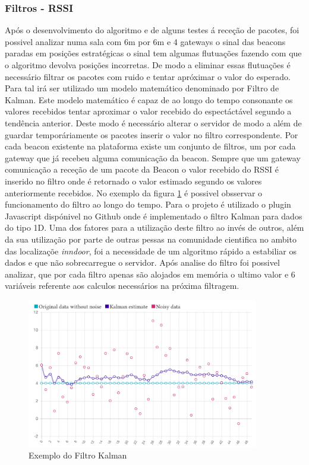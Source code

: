 \subsubsection{Filtros - RSSI}

\par  Após o desenvolvimento do algoritmo e de alguns testes á receção de pacotes, foi possivel analizar numa sala com 6m por 6m  e 4 gateways o sinal das beacons paradas em posições estratégicas   o sinal tem algumas flutuações fazendo com que o algoritmo devolva posições incorretas. De modo a eliminar essas flutuações é necessário filtrar os pacotes com ruido e tentar apróximar o valor do esperado. Para tal irá ser utilizado um modelo matemático denominado por Filtro de Kalman. Este modelo matemático é capaz de ao longo do tempo consonante os valores recebidos tentar aproximar o valor recebido do espectáctável segundo a tendência anterior. Deste modo é necessário alterar o servidor de modo a além de guardar temporáriamente os pacotes inserir o valor no filtro correspondente. Por cada beacon existente na plataforma existe um conjunto de filtros, um por cada gateway que já recebeu alguma comunicação da beacon. Sempre que um gateway comunicação a receção de um pacote da Beacon o valor recebido do RSSI é inserido no filtro onde é retornado o valor estimado segundo os valores anteriormente recebidos. No exemplo da figura \ref{kalman1} é possivel obsservar o funcionamento do filtro ao longo do tempo. Para o projeto é utilizado o plugin Javascript dispónivel no Github onde é implementado o filtro Kalman para dados do tipo 1D. Uma dos fatores para a utilização deste filtro ao invés de outros, além da sua utilização por parte de outras pessas na comunidade cientifica no ambito das localizaçõe \textit{inndoor}, foi a necessidade de um algoritmo rápido a estabiliar os dados e que não sobrecarregue o servidor. Após analise do filtro foi possivel analizar, que por cada filtro apenas são alojados em memória o ultimo valor e 6 variáveis referente aos calculos necessários na próxima filtragem. 

 \begin{figure}[ht]
\centering
\includegraphics[width=0.90\textwidth]{images/kalman-example.png}
\caption{Exemplo do Filtro Kalman \cite{kalman}}\label{kalman1}
\end{figure}



